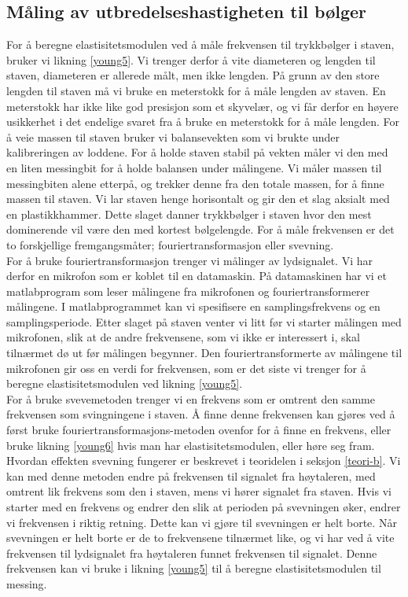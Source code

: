 \documentclass[%
 reprint,
 amsmath,amssymb,
 aps,
 norsk,
 booktabs
]{revtex4-1}
\begin{document}
\subsection{Måling av utbredelseshastigheten til bølger}
For å beregne elastisitetsmodulen ved å måle frekvensen til trykkbølger i staven, bruker vi likning \eqref{young5}. Vi trenger derfor å vite diameteren og lengden til staven, diameteren er allerede målt, men ikke lengden. På grunn av den store lengden til staven må vi bruke en meterstokk for å måle lengden av staven. En meterstokk har ikke like god presisjon som et skyvelær, og vi får derfor en høyere usikkerhet i det endelige svaret fra å bruke en meterstokk for å måle lengden. For å veie massen til staven bruker vi balansevekten som vi brukte under kalibreringen av loddene. For å holde staven stabil på vekten måler vi den med en liten messingbit for å holde balansen under målingene. Vi måler massen til messingbiten alene etterpå, og trekker denne fra den totale massen, for å finne massen til staven. Vi lar staven henge horisontalt og gir den et slag aksialt med en plastikkhammer. Dette slaget danner trykkbølger i staven hvor den mest dominerende vil være den med kortest bølgelengde. For å måle frekvensen er det to forskjellige fremgangsmåter; fouriertransformasjon eller svevning.\\ For å bruke fouriertransformasjon trenger vi målinger av lydsignalet. Vi har derfor en mikrofon som er koblet til en datamaskin. På datamaskinen har vi et matlabprogram som leser målingene fra mikrofonen og fouriertransformerer målingene. I matlabprogrammet kan vi spesifisere en samplingsfrekvens og en samplingsperiode. Etter slaget på staven venter vi litt før vi starter målingen med mikrofonen, slik at de andre frekvensene, som vi ikke er interessert i, skal tilnærmet dø ut før målingen begynner. Den fouriertransformerte av målingene til mikrofonen gir oss en verdi for frekvensen, som er det siste vi trenger for å beregne elastisitetsmodulen ved likning \eqref{young5}.\\
For å bruke svevemetoden trenger vi en frekvens som er omtrent den samme frekvensen som svingningene i staven. Å finne denne frekvensen kan gjøres ved å først bruke fouriertransformasjons-metoden ovenfor for å finne en frekvens, eller bruke likning \eqref{young6} hvis man har elastisitetsmodulen, eller høre seg fram. Hvordan effekten svevning fungerer er beskrevet i teoridelen i seksjon \vref{teori-b}. Vi kan med denne metoden endre på frekvensen til signalet fra høytaleren, med omtrent lik frekvens som den i staven, mens vi hører signalet fra staven. Hvis vi starter med en frekvens og endrer den slik at perioden på svevningen øker, endrer vi frekvensen i riktig retning. Dette kan vi gjøre til svevningen er helt borte. Når svevningen er helt borte er de to frekvensene tilnærmet like, og vi har ved å vite frekvensen til lydsignalet fra høytaleren funnet frekvensen til signalet. Denne frekvensen kan vi bruke i likning \eqref{young5} til å beregne elastisitetsmodulen til messing.
\end{document}
